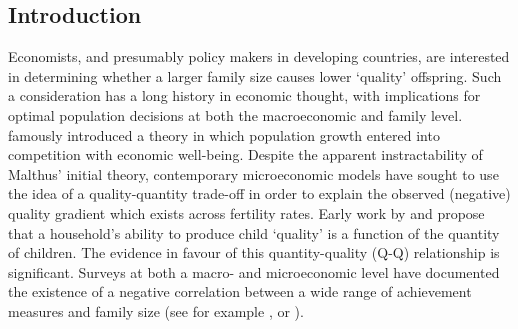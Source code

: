 \documentclass{article}[11pt,subeqn]
\begin{document}
\begin{spacing}{1.5}

\begin{abstract}
Given the endogenous nature of a family's fertility decisions, demonstrating the existence of a trade-off between child quality and child quantity requires the identification of a 
valid exclusion restriction in a quality-quantity model.  Prior work has suggested that multiple births are an appropriate manner to estimate this relationship.  I show that twin 
births are \emph{not} exogenous in a developing country setting, invalidating the identifying assumption of this methodology in this situation.  Instead twin birth depends on a 
range of observable (and potentially unobservable) 
characteristics of the mother, such as height, BMI, and family income.  This effect of this result on typical 2SLS estimates is then examined via Monte Carlo simulation, and 
empirically using pooled results from the Demographic and Health Surveys, a dataset consisting of more that 1,000,00 children from 44 developing countries.  Given the poor 
performance of these estimates under simulation, an alternative methodology is employed to determine the plausibility of family size having any effect on child quality.  This
methodology suggests that higher sibship produces a larger delay in educational attainment and total years of schooling, but suggests that family size has less effect on child
attendance.  
\end{abstract}

\section{Introduction}
\label{scn:intro}
Economists, and presumably policy makers in developing countries, are interested in determining whether a larger family size causes lower `quality' offspring.  Such a consideration
 has a long history in economic thought, with implications for optimal population decisions at both the macroeconomic and family level.  
\citet{Malthus1798} famously introduced a theory in which population 
growth entered into competition with economic well-being.  Despite the apparent instractability of Malthus' initial theory, contemporary microeconomic models have sought to use 
the idea of a quality-quantity trade-off in order to explain the observed (negative) quality gradient which exists across fertility rates.  Early work by \citet{BeckerLewis1973} 
and \citet{BeckerTomes1976} propose that a household's ability to produce child `quality' is a function of the quantity of children.  The evidence in favour of this quantity-quality 
(Q-Q) relationship is significant.  Surveys at both a macro- and microeconomic level have documented the existence of a negative correlation between a wide range of achievement 
measures and family size (see for example \cite{Desai1995}, or \cite{Hanushek1992}).


\end{spacing}
\end{document}
